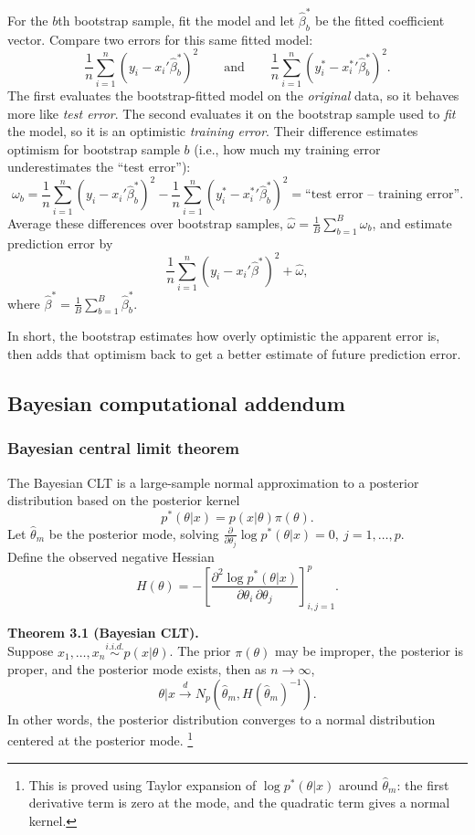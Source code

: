 For the $b$th bootstrap sample, fit the model and let $\hat\beta_b^*$ be the fitted coefficient vector. Compare two errors for this same fitted model:
\[
    \frac{1}{n}\sum_{i=1}^n
    \left(y_i-x_i'\hat\beta_b^*\right)^2
    \qquad\text{and}\qquad
    \frac{1}{n}\sum_{i=1}^n
    \left(y_i^*-{x_i^*}'\hat\beta_b^*\right)^2.
\]
The first evaluates the bootstrap-fitted model on the \emph{original} data, so it behaves more like \emph{test error}. The second evaluates it on the bootstrap sample used to \emph{fit} the model, so it is an optimistic \emph{training error}. Their difference estimates optimism for bootstrap sample $b$ (i.e., how much my training error underestimates the ``test error''):
\[
    \omega_b
    =
    \frac{1}{n}\sum_{i=1}^n
    \left(y_i-x_i'\hat\beta_b^*\right)^2
    -
    \frac{1}{n}\sum_{i=1}^n
    \left(y_i^*-{x_i^*}'\hat\beta_b^*\right)^2
    = 
    \text{``test error -- training error''}.
\]
Average these differences over bootstrap samples, $\hat\omega=\frac{1}{B}\sum_{b=1}^B\omega_b$, and estimate prediction error by
\[
    \frac{1}{n}\sum_{i=1}^n
    \left(y_i-x_i'\hat\beta^*\right)^2
    +
    \hat\omega,
\]
where $\hat\beta^* = \frac{1}{B} \sum_{b=1}^B \hat\beta_b^*$.

In short, the bootstrap estimates how overly optimistic the apparent error is, then adds that optimism back to get a better estimate of future prediction error.



\subsection{Bayesian computational addendum}
\subsubsection{Bayesian central limit theorem}
The Bayesian CLT is a large-sample normal approximation to a posterior distribution based on the posterior kernel 
\[
    p^*(\theta |  x)=p(x |  \theta)\pi(\theta).
\]
Let $\hat\theta_m$ be the posterior mode, solving $\frac{\partial}{\partial \theta_j}\log p^*(\theta |  x)=0,\ j=1,\ldots,p$.\\
Define the observed negative Hessian
\[
    H(\theta)
    =
    -
    \left[
        \frac{\partial^2 \log p^*(\theta |  x)}
             {\partial\theta_i\,\partial\theta_j}
    \right]_{i,j=1}^p.
\]

\textbf{Theorem 3.1 (Bayesian CLT).}\\
Suppose $x_1,\ldots,x_n \stackrel{i.i.d.}{\sim} p(x | \theta)$. The prior $\pi(\theta)$ may be improper, the posterior is proper, and the posterior mode exists, then as $n\to\infty$,
\[
    \theta |  x
    \stackrel{d}{\rightarrow}
    N_p\!\left(\hat\theta_m, H(\hat\theta_m)^{-1}\right).
\]
In other words, the posterior distribution converges to a normal distribution centered at the posterior mode.
\footnote{This is proved using Taylor expansion of $\log p^*(\theta | x)$ around $\hat\theta_m$: the first derivative term is zero at the mode, and the quadratic term gives a normal kernel.}

